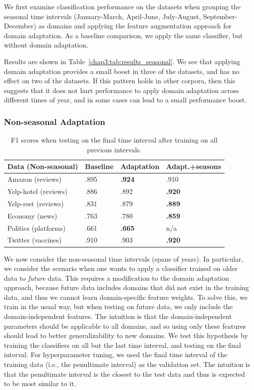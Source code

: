 We first examine classification performance on the datasets when grouping the seasonal time intervals (January-March, April-June, July-August, September-December) as domains and applying the feature augmentation approach for domain adaptation. 
As a baseline comparison, we apply the same classifier, but without domain adaptation.

Results are shown in Table~\ref{chap3:tab:results_seasonal}.
We see that applying domain adaptation provides a small boost in three of the datasets, and has no effect on two of the datasets.
If this pattern holds in other corpora, then this suggests that it does not hurt performance to apply domain adaptation across different times of year, and in some cases can lead to a small performance boost.

\subsubsection{Non-seasonal Adaptation}
\label{subsec:nonseasonal}

\begin{table}[htp]
\centering
\begin{tabular}{|l|l|l|l|}
\hline
\bf Data (Non-seasonal) & \bf Baseline & \bf Adaptation & \bf Adapt.+seasons \\
\hline
Amazon (reviews) & .895 & \bf .924 & .910 \\
Yelp-hotel (reviews) & .886 & .892 & \bf .920 \\
Yelp-rest (reviews) & .831 & .879 & \bf .889   \\
Economy (news) & .763 & .780 & \bf .859 \\
Politics (platforms) & .661 & \bf .665 & n/a \\
Twitter (vaccines) & .910 & .903 & \bf .920 \\
\hline
\end{tabular}
\caption{\label{chap3:tab:results_nonseasonal_future} F1 scores when testing on the final time interval after training on all previous intervals.}
\end{table}

We now consider the non-seasonal time intervals (spans of years). 
In particular, we consider the scenario when one wants to apply a classifier trained on older data to {\em future} data.
This requires a modification to the domain adaptation approach, because future data includes domains that did not exist in the training data, and thus we cannot learn domain-specific feature weights.
To solve this, we train in the usual way, but when testing on future data, we only include the domain-independent features.
The intuition is that the domain-independent parameters should be applicable to all domains, and so using only these features should lead to better generalizability to new domains.
We test this hypothesis by training the classifiers on all but the last time interval, and testing on the final interval.
For hyperparameter tuning, we used the final time interval of the training data (i.e., the penultimate interval) as the validation set. The intuition is that the penultimate interval is the closest to the test data and thus is expected to be most similar to it.

